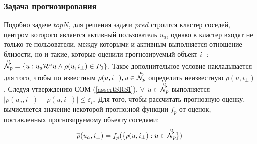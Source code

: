 
\subsubsection{Задача прогнозирования}
Подобно задаче $topN$, для решения задачи $pred$ \cite{cfrs, cf-expert,
rs-handbook, toward,coscial-rec-survey, user-item-cf,rs-cf}
строится кластер соседей, центром которого является активный пользователь
$u_a$, однако в кластер входят не только те пользователи, между которыми
и активным выполняется отношение близости, но и такие, которые оценили
прогнозируемый объект $i_{\bot}$:
${\overset{u}{\mathcal{N}_p}} = \{u: u_a \mathcal{R}^u u \wedge \rho(u,i_{\bot}) \in P_0\}$. Такое дополнительное
условие накладывается для того, чтобы по известным $\rho(u, i_{\bot}), u \in {\overset{u}{\mathcal{N}_p}}$
определить неизвестную $\rho(u,i_{\bot})$.
Следуя утверждению СОМ (\ref{assertSRS1}), $\forall$ $u \in {\overset{u}{\mathcal{N}_p}}$ выполняется $|\rho(u_a,i_{\bot}) -
\rho(u,i_{\bot})| \le
\varepsilon_p$.
Для того, чтобы рассчитать прогнозную оценку,
вычисляется значение некоторой прогнозной функции $f_p$
от оценок, поставленных прогнозируемому объекту соседями:
\begin{equation}
	\overline{\rho}(u_a,i_{\bot}) = f_p(\{ \rho(u,i_{\bot}): u \in {\overset{u}{\mathcal{N}_p}} \})
\end{equation}

